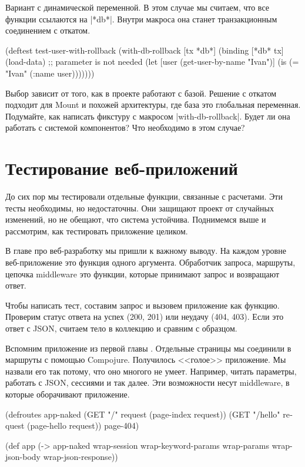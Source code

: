 Вариант с динамической переменной. В этом случае мы считаем, что все функции
ссылаются на \spverb|*db*|. Внутри макроса она станет транзакционным соединением
с откатом.

\begin{english}
  \begin{clojure}
(deftest test-user-with-rollback
  (with-db-rollback [tx *db*]
    (binding [*db* tx]
      (load-data) ;; parameter is not needed
      (let [user (get-user-by-name "Ivan")]
        (is (= "Ivan" (:name user)))))))
  \end{clojure}
\end{english}

Выбор зависит от того, как в проекте работают с базой. Решение с откатом
подходит для Mount и похожей архитектуры, где база это глобальная
переменная. Подумайте, как написать фикстуру с макросом
\spverb|with-db-rollback|. Будет ли она работать с системой компонентов? Что
необходимо в этом случае?

\section{Тестирование веб-приложений}

До сих пор мы тестировали отдельные функции, связанные с расчетами. Эти тесты
необходимы, но недостаточны. Они защищают проект от случайных изменений, но не
обещают, что система устойчива. Поднимемся выше и рассмотрим, как тестировать
приложение целиком.

В главе про веб-разработку мы пришли к важному выводу. На каждом уровне
веб-приложение это функция одного аргумента. Обработчик запроса, маршруты,
цепочка middleware это функции, которые принимают запрос и возвращают ответ.

Чтобы написать тест, составим запрос и вызовем приложение как функцию. Проверим
статус ответа на успех (200, 201) или неудачу (404, 403). Если это ответ с JSON,
считаем тело в коллекцию и сравним с образцом.

Вспомним приложение из первой главы . Отдельные страницы мы
соединили в маршруты с помощью Compojure. Получилось <<голое>> приложение. Мы
назвали его так потому, что оно многого не умеет. Например, читать параметры,
работать с JSON, сессиями и так далее. Эти возможности несут middleware, в
которые оборачивают приложение.

\begin{english}
  \begin{clojure}
(defroutes app-naked
  (GET "/"      request (page-index request))
  (GET "/hello" request (page-hello request))
  page-404)

(def app
  (-> app-naked
      wrap-session
      wrap-keyword-params
      wrap-params
      wrap-json-body
      wrap-json-response))
  \end{clojure}
\end{english}

